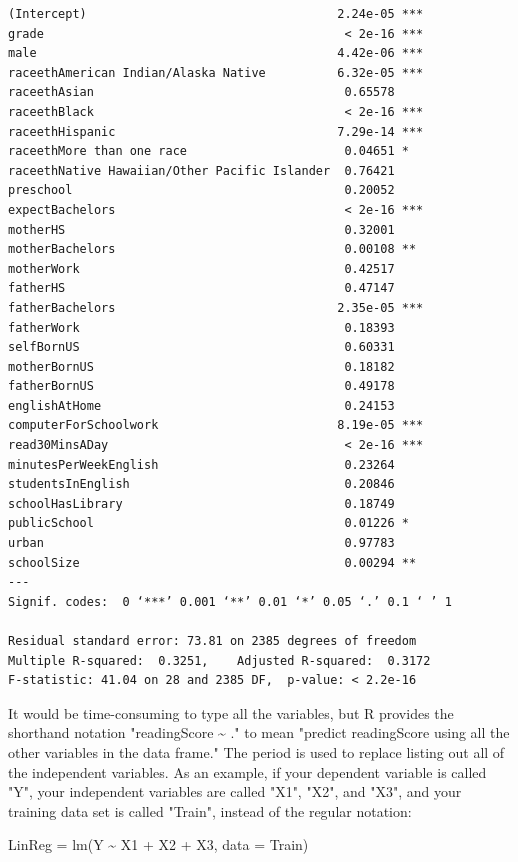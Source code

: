 \documentclass[letterpaper, 9pt, onecolumn, twoside, technote, final]{IEEEtran}
\begin{document}
\begin{verbatim}
(Intercept)                                   2.24e-05 ***
grade                                          < 2e-16 ***
male                                          4.42e-06 ***
raceethAmerican Indian/Alaska Native          6.32e-05 ***
raceethAsian                                   0.65578
raceethBlack                                   < 2e-16 ***
raceethHispanic                               7.29e-14 ***
raceethMore than one race                      0.04651 *
raceethNative Hawaiian/Other Pacific Islander  0.76421
preschool                                      0.20052
expectBachelors                                < 2e-16 ***
motherHS                                       0.32001
motherBachelors                                0.00108 **
motherWork                                     0.42517
fatherHS                                       0.47147
fatherBachelors                               2.35e-05 ***
fatherWork                                     0.18393
selfBornUS                                     0.60331
motherBornUS                                   0.18182
fatherBornUS                                   0.49178
englishAtHome                                  0.24153
computerForSchoolwork                         8.19e-05 ***
read30MinsADay                                 < 2e-16 ***
minutesPerWeekEnglish                          0.23264
studentsInEnglish                              0.20846
schoolHasLibrary                               0.18749
publicSchool                                   0.01226 *
urban                                          0.97783
schoolSize                                     0.00294 **
---
Signif. codes:  0 ‘***’ 0.001 ‘**’ 0.01 ‘*’ 0.05 ‘.’ 0.1 ‘ ’ 1

Residual standard error: 73.81 on 2385 degrees of freedom
Multiple R-squared:  0.3251,	Adjusted R-squared:  0.3172
F-statistic: 41.04 on 28 and 2385 DF,  p-value: < 2.2e-16
\end{verbatim}

It would be time-consuming to type all the variables, but R provides
the shorthand notation "readingScore \textasciitilde{} ." to mean "predict
readingScore using all the other variables in the data frame." The
period is used to replace listing out all of the independent
variables. As an example, if your dependent variable is called "Y",
your independent variables are called "X1", "X2", and "X3", and your
training data set is called "Train", instead of the regular notation:

LinReg = lm(Y \textasciitilde{} X1 + X2 + X3, data = Train)
\end{document}
